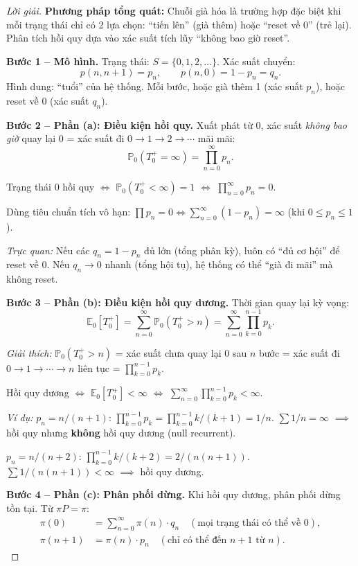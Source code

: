 \documentclass[8pt,a4paper]{article}
\newenvironment{solution}{\begin{proof}[Lời giải]}{\end{proof}}
\newcommand{\prob}{\mathbb{P}}
\newcommand{\E}{\mathbb{E}}
\begin{document}
\begin{solution}
\textbf{Phương pháp tổng quát:} Chuỗi già hóa là trường hợp đặc biệt khi mỗi trạng thái chỉ có 2 lựa chọn: ``tiến lên'' (già thêm) hoặc ``reset về 0'' (trẻ lại). Phân tích hồi quy dựa vào xác suất tích lũy ``không bao giờ reset''.

\textbf{Bước 1 -- Mô hình.}
Trạng thái: $S = \{0, 1, 2, \ldots\}$. Xác suất chuyển:
\[
  p(n, n+1) = p_n, \qquad p(n, 0) = 1 - p_n = q_n.
\]
Hình dung: ``tuổi'' của hệ thống. Mỗi bước, hoặc già thêm 1 (xác suất $p_n$), hoặc reset về 0 (xác suất $q_n$).

\textbf{Bước 2 -- Phần (a): Điều kiện hồi quy.}
Xuất phát từ 0, xác suất \textit{không bao giờ} quay lại 0 = xác suất đi $0 \to 1 \to 2 \to \cdots$ mãi mãi:
\[
  \prob_0(T_0^+ = \infty) = \prod_{n=0}^{\infty} p_n.
\]

Trạng thái 0 hồi quy $\iff$ $\prob_0(T_0^+ < \infty) = 1$ $\iff$ $\prod_{n=0}^{\infty} p_n = 0$.

Dùng tiêu chuẩn tích vô hạn: $\prod p_n = 0 \iff \sum_{n=0}^{\infty} (1 - p_n) = \infty$ (khi $0 \leq p_n \leq 1$).

\textit{Trực quan:} Nếu các $q_n = 1-p_n$ đủ lớn (tổng phân kỳ), luôn có ``đủ cơ hội'' để reset về 0. Nếu $q_n \to 0$ nhanh (tổng hội tụ), hệ thống có thể ``già đi mãi'' mà không reset.

\textbf{Bước 3 -- Phần (b): Điều kiện hồi quy dương.}
Thời gian quay lại kỳ vọng:
\[
  \E_0[T_0^+] = \sum_{n=0}^{\infty} \prob_0(T_0^+ > n) = \sum_{n=0}^{\infty} \prod_{k=0}^{n-1} p_k.
\]

\textit{Giải thích:} $\prob_0(T_0^+ > n)$ = xác suất chưa quay lại 0 sau $n$ bước = xác suất đi $0 \to 1 \to \cdots \to n$ liên tục = $\prod_{k=0}^{n-1} p_k$.

Hồi quy dương $\iff$ $\E_0[T_0^+] < \infty$ $\iff$ $\sum_{n=0}^{\infty} \prod_{k=0}^{n-1} p_k < \infty$.

\textit{Ví dụ:} $p_n = n/(n+1)$: $\prod_{k=0}^{n-1} p_k = \prod_{k=0}^{n-1} k/(k+1) = 1/n$. $\sum 1/n = \infty$ $\implies$ hồi quy nhưng \textbf{không} hồi quy dương (null recurrent).

$p_n = n/(n+2)$: $\prod_{k=0}^{n-1} k/(k+2) = 2/(n(n+1))$. $\sum 1/(n(n+1)) < \infty$ $\implies$ hồi quy dương.

\textbf{Bước 4 -- Phần (c): Phân phối dừng.}
Khi hồi quy dương, phân phối dừng tồn tại. Từ $\pi P = \pi$:
\begin{align*}
  \pi(0) &= \sum_{n=0}^{\infty} \pi(n) \cdot q_n \quad (\text{mọi trạng thái có thể về 0}), \\
  \pi(n+1) &= \pi(n) \cdot p_n \quad (\text{chỉ có thể đến } n+1 \text{ từ } n).
\end{align*}


\end{solution}
\end{document}
